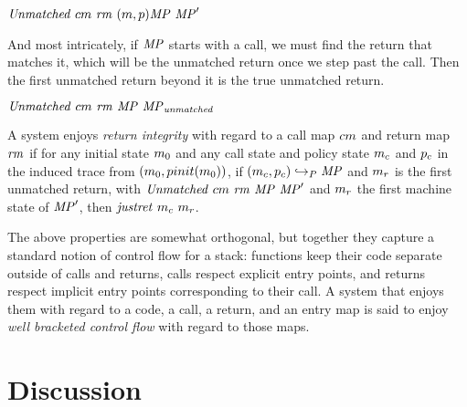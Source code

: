 \documentclass[acmsmall,review,anonymous]{acmart}\settopmatter{printfolios=true,printccs=false,printacmref=false}
\begin{document}
           {\(\mathit{Unmatched}\ \callmap\ \retmap\
            \mpstate{\mach}{\pol}\MPT\ \MPT'\)}

And most intricately, if \(\mathit{MP}\) starts with a call, we must find the
return that matches it, which will be the unmatched return once we
step past the call. Then the first unmatched return beyond it is the
true unmatched return.

            {\(\mathit{Unmatched}\ \callmap\ \retmap\ \MPT\ \MPT_{\mathit{unmatched}}\)}

A system enjoys {\em return integrity} with regard to a call map
\(cm\) and return map \(\mathit{rm}\) if for any initial state
\(m_0\) and any call state and policy state \(m_c\) and
\(p_c\) in the induced trace from
\((m_0,pinit(m_0))\), if \((m_c,p_c)
\hookrightarrow_P \mathit{MP}\) and \(m_r\) is the first unmatched
return, with \(\mathit{Unmatched}\ \callmap\ \retmap\ \MPT \ \MPT'\)
and \(m_r\) the first machine state of \(\mathit{MP}'\), then
\(\mathit{justret}\ m_c\ m_r\).

The above properties are somewhat orthogonal, but together they
capture a standard notion of control flow for a stack: functions keep
their code separate outside of calls and returns, calls respect
explicit entry points, and returns respect implicit entry points
corresponding to their call.  A system that enjoys them with regard to
a code, a call, a return, and an entry map is said to enjoy {\em well
  bracketed control flow} with regard to those maps.

\section{Discussion}
\label{sec:disc}
\end{document}
